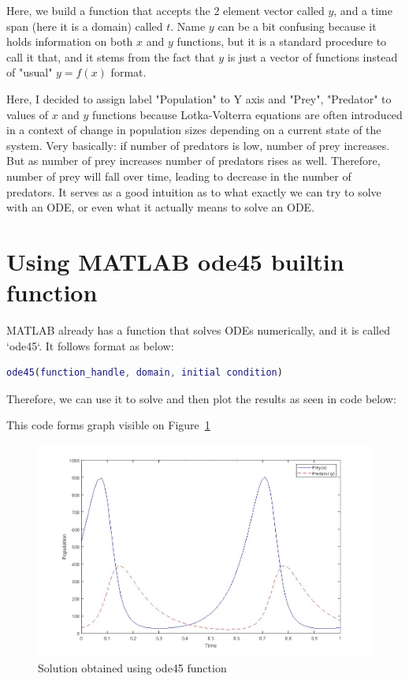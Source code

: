 \documentclass[11pt]{article}
\begin{document}
Here, we build a function that accepts the 2 element vector called $y$, and a
time span (here it is a domain) called $t$. Name $y$ can be a bit confusing because it holds
information on both $x$ and $y$ functions, but it is a standard procedure to call it that,
and it stems from the fact that $y$ is just a vector of functions instead of "usual" $y=f(x)$
format.

Here, I decided to assign label "Population" to Y axis and "Prey", "Predator"
to values of $x$ and $y$ functions because Lotka-Volterra equations are often
introduced in a context of change in population sizes depending on a current
state of the system. Very basically: if number of predators is low, number of
prey increases. But as number of prey increases number of predators rises as
well. Therefore, number of prey will fall over time, leading to decrease in the
number of predators. It serves as a good intuition as to what exactly we can 
try to solve with an ODE, or even what it actually means to solve an ODE.

\newpage
\section{Using MATLAB ode45 builtin function}
MATLAB already has a function that solves ODEs numerically, and it is called
`ode45`. It follows format as below:
\begin{lstlisting}[language=MATLAB]
    ode45(function_handle, domain, initial condition)
\end{lstlisting}

Therefore, we can use it to solve and then plot the results as seen in code below:


This code forms graph visible on Figure~\ref{fig:ode45reference}
\begin{figure}[ht!]
    \includegraphics[width=\textwidth]{ode45reference.jpg}
    \caption{Solution obtained using ode45 function}
    \label{fig:ode45reference}
\end{figure}
\end{document}
